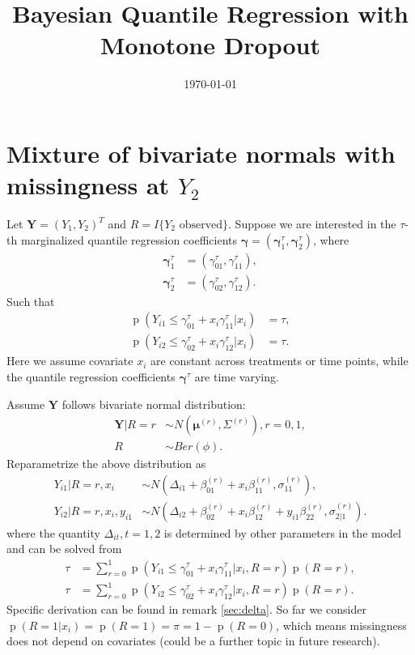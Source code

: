 \documentclass[12pt]{article}
\title{Bayesian Quantile Regression with Monotone Dropout}
\date{\today}
\author{}
\DeclareMathOperator{\pr}{p}
\begin{document}
\maketitle{}

\section{Mixture of bivariate normals with missingness at $Y_2$}

Let $\bm{Y} = (Y_{1}, Y_{2})^{T}$ and $R = I\{Y_2 \text{ observed}\}$. Suppose we
are interested in the $\tau$-th marginalized quantile regression
coefficients $\bm \gamma = (\bm \gamma^{\tau}_1, \bm \gamma^{\tau}_2)$, where
\begin{align*}
  \bm \gamma_1^{\tau} & = (\gamma_{01}^{\tau}, \gamma^{\tau}_{11}), \\
  \bm \gamma_{2}^{\tau} & = (\gamma_{02}^{\tau}, \gamma^{\tau}_{12}).
\end{align*}
Such that
\begin{align}
  \label{eq:quan1}
  \pr (Y_{i1} \leq \gamma^{\tau}_{01} + x_i \gamma^{\tau}_{11} | x_i ) & = \tau ,\\
  \label{eq:quan2}
  \pr (Y_{i2} \leq \gamma^{\tau}_{02} + x_i \gamma^{\tau}_{12} | x_i ) & = \tau .
\end{align}
Here we assume covariate $x_i$ are constant across treatments or time
points, while the quantile regression coefficients $\bm \gamma^{\tau}$
are time varying.
 
Assume $\bm Y$ follows bivariate normal distribution:
\begin{align*}
  \bm{Y}|R = r &\sim N(\bm{\mu}^{(r)}, \Sigma^{(r)}), r = 0, 1,\\
  R & \sim Ber(\phi).
\end{align*}
Reparametrize the above distribution as
\begin{align}
  \label{eq:model1}
  Y_{i1}|R = r, x_i &\sim N(\Delta_{i1} + \beta_{01}^{(r)} + x_i\beta_{11}^{(r)}, \sigma_{11}^{(r)}),\\
  \label{eq:model2}
  Y_{i2}|R = r, x_i, y_{i1} & \sim N(\Delta_{i2} + \beta_{02}^{(r)} +
  x_i\beta_{12}^{(r)} + y_{i1}\beta_{22}^{(r)}, \sigma_{2|1}^{(r)}).
\end{align}
where the quantity $\Delta_{it}, t = 1, 2$ is determined by other
parameters in the model and can be solved from
\begin{align}
  \label{eq:const1}
  \tau & =  \sum_{r = 0}^1 \pr (Y_{i1} \leq \gamma^{\tau}_{01} + x_i \gamma^{\tau}_{11} | x_i , R = r) \pr (R = r), \\
  \label{eq:const2}
  \tau & = \sum_{r = 0}^{1} \pr (Y_{i2} \leq \gamma^{\tau}_{02} + x_i \gamma^{\tau}_{12} | x_i , R =
  r) \pr (R = r).
\end{align}
Specific derivation can be found in remark \ref{sec:delta}. So far we
consider $\pr (R = 1|x_i) = \pr (R = 1) = \pi = 1 - \pr (R = 0)$,
which means missingness does not depend on covariates (could be a
further topic in future research).
\end{document}
